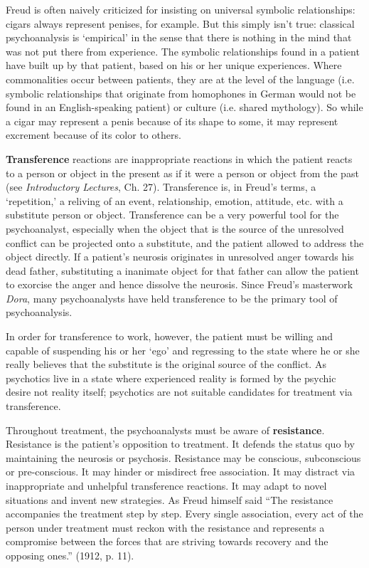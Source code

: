 Freud is often naively criticized for insisting on universal symbolic relationships: cigars always represent penises, for example. But this simply isn't true: classical psychoanalysis is `empirical' in the sense that there is nothing in the mind that was not put there from experience. The symbolic relationships found in a patient have built up by that patient, based on his or her unique experiences. Where commonalities occur between patients, they are at the level of the language (i.e. symbolic relationships that originate from homophones in German would not be found in an English-speaking patient) or culture (i.e. shared mythology). So while a cigar may represent a penis because of its shape to some, it may represent excrement because of its color to others.

\textbf{Transference} reactions are inappropriate reactions in which the patient reacts to a person or object in the present as if it were a person or object from the past (see \emph{Introductory Lectures}, Ch. 27). Transference is, in Freud's terms, a `repetition,' a reliving of an event, relationship, emotion, attitude, etc. with a substitute person or object. Transference can be a very powerful tool for the psychoanalyst, especially when the object that is the source of the unresolved conflict can be projected onto a substitute, and the patient allowed to address the object directly. If a patient's neurosis originates in unresolved anger towards his dead father, substituting a inanimate object for that father can allow the patient to exorcise the anger and hence dissolve the neurosis. Since Freud's masterwork \emph{Dora}, many psychoanalysts have held transference to be the primary tool of psychoanalysis.

In order for transference to work, however, the patient must be willing and capable of suspending his or her `ego' and regressing to the state where he or she really believes that the substitute is the original source of the conflict. As psychotics live in a state where experienced reality is formed by the psychic desire not reality itself; psychotics are not suitable candidates for treatment via transference.

Throughout treatment, the psychoanalysts must be aware of \textbf{resistance}. Resistance is the patient's opposition to treatment. It defends the status quo by maintaining the neurosis or psychosis. Resistance may be conscious, subconscious or pre-conscious. It may hinder or misdirect free association. It may distract via inappropriate and unhelpful transference reactions. It may adapt to novel situations and invent new strategies. As Freud himself said ``The resistance accompanies the treatment step by step. Every single association, every act of the person under treatment must reckon with the resistance and represents a compromise between the forces that are striving towards recovery and the opposing ones.'' (1912, p. 11).

